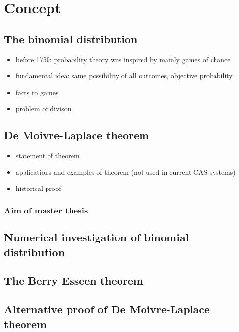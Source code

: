\chapter{Concept}

\section{The binomial distribution}

\begin{itemize}
  \item before 1750: probability theory was inspired by mainly games of chance~\cite[p. 4]{hald1}
  \item fundamental idea: same possibility of all outcomes, objective probability\cite[chapter 3]{hald1}
  \item facts to games \cite[p 33/34]{hald1}
  \item problem of divison \cite[chapter 5]{hald1}
\end{itemize}

\section{De Moivre-Laplace theorem}

\begin{itemize}
  \item statement of theorem
  \item applications and examples of theorem (not used in current CAS systems)
  \item historical proof 
\end{itemize}

\subsection{Aim of master thesis}

\section{Numerical investigation of binomial distribution}

\section{The Berry Esseen theorem}

\section{Alternative proof of De Moivre-Laplace theorem}
